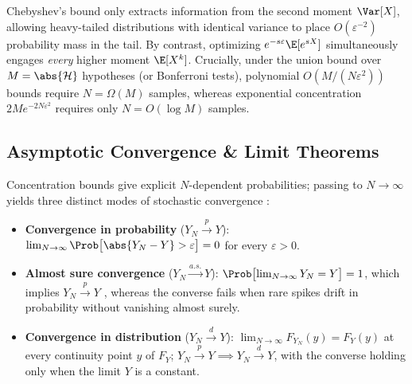 \documentclass[../../../../master.tex]{subfiles}
\begin{document}
\begin{intuition}
Chebyshev's bound only extracts information from the second moment $\Var[X]$, allowing heavy-tailed distributions with identical variance to place $O(\varepsilon^{-2})$ probability mass in the tail. By contrast, optimizing $e^{-s\varepsilon}\E[e^{sX}]$ simultaneously engages \emph{every} higher moment $\E[X^k]$. Crucially, under the union bound over $M = \abs{\mathcal{H}}$ hypotheses (or Bonferroni tests), polynomial $O(M/(N\varepsilon^2))$ bounds require $N = \Omega(M)$ samples, whereas exponential concentration $2M e^{-2N\varepsilon^2}$ requires only $N = O(\log M)$ samples.
\end{intuition}

\subsection{Asymptotic Convergence \& Limit Theorems}
\label{sec:asymp:limits}

Concentration bounds give explicit $N$-dependent probabilities; passing to $N \to \infty$ yields three distinct modes of stochastic convergence :
\begin{itemize}
  \item \textbf{Convergence in probability} ($Y_N \xrightarrow{p} Y$): $\lim_{N\to\infty} \Prob\bigl[\abs{Y_N - Y} > \varepsilon\bigr] = 0$ for every $\varepsilon > 0$.
  \item \textbf{Almost sure convergence} ($Y_N \xrightarrow{a.s.} Y$): $\Prob\bigl[\lim_{N\to\infty} Y_N = Y\bigr] = 1$, which implies $Y_N \xrightarrow{p} Y$ , whereas the converse fails when rare spikes drift in probability without vanishing almost surely.
  \item \textbf{Convergence in distribution} ($Y_N \xrightarrow{d} Y$): $\lim_{N\to\infty} F_{Y_N}(y) = F_Y(y)$ at every continuity point $y$ of $F_Y$; $Y_N \xrightarrow{p} Y \implies Y_N \xrightarrow{d} Y$, with the converse holding only when the limit $Y$ is a constant.
\end{itemize}
\end{document}
